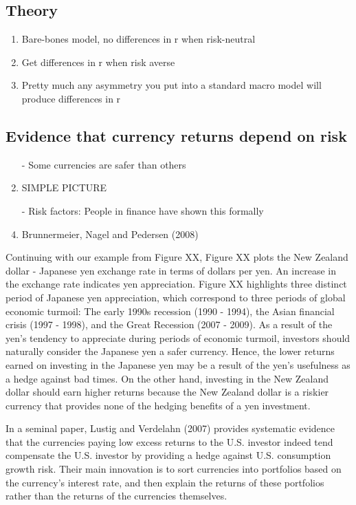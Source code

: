 \documentclass[12pt,letter]{article}
\theoremstyle{break} \theorembodyfont{\normalfont\itshape}
\theoremstyle{break}
\theoremstyle{break} \theorembodyfont{\normalfont\itshape}
\theoremstyle{break} \theorembodyfont{\normalfont\itshape}
\begin{document}
\subsection{Theory}
\begin{enumerate}
    \item Bare-bones model, no differences in r when risk-neutral
    \item Get differences in r when risk averse
    \item Pretty much any asymmetry you put into a standard macro model will produce differences in r
\end{enumerate}

\subsection{Evidence that currency returns depend on risk}
\begin{enumerate}
\item[-] Some currencies are safer than others
\item SIMPLE PICTURE
\item[-] Risk factors: People in finance have shown this formally
\item Brunnermeier, Nagel and Pedersen (2008)
\end{enumerate}

Continuing with our example from Figure XX, Figure XX plots the New Zealand dollar - Japanese yen exchange rate in terms of dollars per yen. An increase in the exchange rate indicates yen appreciation. Figure XX highlights three distinct period of Japanese yen appreciation, which correspond to three periods of global economic turmoil: The early 1990s recession (1990 - 1994), the Asian financial crisis (1997 - 1998), and the Great Recession (2007 - 2009). As a result of the yen's tendency to appreciate during periods of economic turmoil, investors should naturally consider the Japanese yen a safer currency. Hence, the lower returns earned on investing in the Japanese yen may be a result of the yen's usefulness as a hedge against bad times. On the other hand, investing in the New Zealand dollar should earn higher returns because the New Zealand dollar is a riskier currency that provides none of the hedging benefits of a yen investment.

In a seminal paper, Lustig and Verdelahn (2007) provides systematic evidence that the currencies paying low excess returns to the U.S. investor indeed tend compensate the U.S. investor by providing a hedge against U.S. consumption growth risk. Their main innovation is to sort currencies into portfolios based on the currency's interest rate, and then explain the returns of these portfolios rather than the returns of the currencies themselves. 
\end{document}
